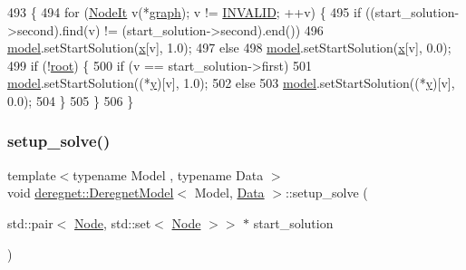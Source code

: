 \begin{DoxyCode}
493                                                                                                            
      \{
494     \textcolor{keywordflow}{for} (\hyperlink{namespacederegnet_ac34314e1b5f456fc6d1bb9d96316de4a}{NodeIt} v(*\hyperlink{classderegnet_1_1DeregnetModel_a3cd2f54b8e061ef5bed32708d9bc1ef1}{graph}); v != \hyperlink{usinglemon_8hpp_adf770fe2eec438e3758ffe905dbae208}{INVALID}; ++v) \{
495         \textcolor{keywordflow}{if} ((start\_solution->second).find(v) != (start\_solution->second).end())
496             \hyperlink{classderegnet_1_1DeregnetModel_a30d525de2086e342b33fe3e45ede4947}{model}.setStartSolution(\hyperlink{classderegnet_1_1DeregnetModel_a360c980f3fec4dfbab50e9bb06a933a8}{x}[v], 1.0);
497         \textcolor{keywordflow}{else}
498             \hyperlink{classderegnet_1_1DeregnetModel_a30d525de2086e342b33fe3e45ede4947}{model}.setStartSolution(\hyperlink{classderegnet_1_1DeregnetModel_a360c980f3fec4dfbab50e9bb06a933a8}{x}[v], 0.0);
499         \textcolor{keywordflow}{if} (!\hyperlink{classderegnet_1_1DeregnetModel_a54b20393a0e26d65935d387685d7fe96}{root}) \{
500             \textcolor{keywordflow}{if} (v == start\_solution->first)
501                 \hyperlink{classderegnet_1_1DeregnetModel_a30d525de2086e342b33fe3e45ede4947}{model}.setStartSolution((*\hyperlink{classderegnet_1_1DeregnetModel_ae76df61afe302b939165facf3dd21ac8}{y})[v], 1.0);
502             \textcolor{keywordflow}{else}
503                 \hyperlink{classderegnet_1_1DeregnetModel_a30d525de2086e342b33fe3e45ede4947}{model}.setStartSolution((*\hyperlink{classderegnet_1_1DeregnetModel_ae76df61afe302b939165facf3dd21ac8}{y})[v], 0.0);
504         \}
505     \}
506 \}
\end{DoxyCode}
\mbox{\label{classderegnet_1_1DeregnetModel_a502657403c84cbdc66ad845c56dee339}} 
\subsubsection{\texorpdfstring{setup\+\_\+solve()}{setup\_solve()}}
{\footnotesize\ttfamily template$<$typename Model , typename Data $>$ \\
void \hyperlink{classderegnet_1_1DeregnetModel}{deregnet\+::\+Deregnet\+Model}$<$ Model, \hyperlink{avgdrgnt_8cpp_a1d1235306db276e9b36acba1db1509e8}{Data} $>$\+::setup\+\_\+solve (\begin{DoxyParamCaption}\item[{std\+::pair$<$ \hyperlink{namespacederegnet_a744bad34f2de9856d36715a445f027f3}{Node}, std\+::set$<$ \hyperlink{namespacederegnet_a744bad34f2de9856d36715a445f027f3}{Node} $>$$>$ $\ast$}]{start\+\_\+solution }\end{DoxyParamCaption})\hspace{0.3cm}{\ttfamily [private]}}




